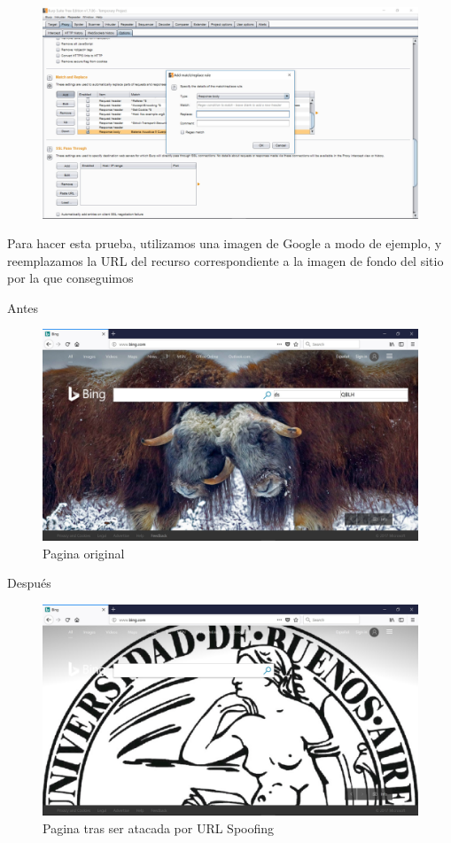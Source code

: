 \documentclass[10pt,a4paper]{article}
\begin{document}
\begin{figure}[H]
\centerline{\includegraphics[scale=0.15]{images/match_and_replace.jpg}}
\caption{}
\end{figure}

Para hacer esta prueba, utilizamos una imagen de Google a modo de ejemplo, y reemplazamos la URL del recurso correspondiente a la imagen de fondo del sitio por la que conseguimos\newline

Antes\newline
\begin{figure}[H]
\centerline{\includegraphics[scale=0.17]{images/bing_1.jpg}}
\caption{Pagina original}
\end{figure}
Después\newline
\begin{figure}[H]
\centerline{\includegraphics[scale=0.17]{images/bing_3.jpg}}
\caption{Pagina tras ser atacada por URL Spoofing}
\end{figure}
\end{document}
